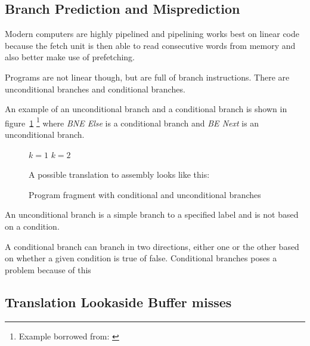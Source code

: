 \subsection{Branch Prediction and Misprediction}
Modern computers are highly pipelined and pipelining works best on linear code because the fetch unit is then able to read consecutive words from memory and also better make use of prefetching.

Programs are not linear though, but are full of branch instructions. There are unconditional branches and conditional branches. 

An example of an unconditional branch and a conditional branch is shown in figure~\ref{fig:branchexample} \footnote{Example borrowed from: \citep[Section~4.5.2]{Tanenbaum}} where \textit{BNE Else} is a conditional branch and \textit{BE Next} is an unconditional branch.
 

\begin{figure}\begin{framed}
\begin{algorithmic}
	\State $k = 1$
\Else
	\State $k = 2$
\EndIf
\end{algorithmic}
\vspace{0.3cm}
\noindent
A possible translation to assembly looks like this:
\vspace{0.3cm}
\begin{compactenum}
\item \itab{ }  
\item \itab{ }  
\item {}  
\item \itab{ }  
\item {}  
\item {}
\end{compactenum}
\caption{Program fragment with conditional and unconditional branches}
\label{fig:branchexample}
\end{framed}
\end{figure}

An unconditional branch is a simple branch to a specified label and is not based on a condition.

A conditional branch can branch in two directions, either one or the other based on whether a given condition is true of false.
Conditional branches poses a problem because of this 






\subsection{Translation Lookaside Buffer misses}
